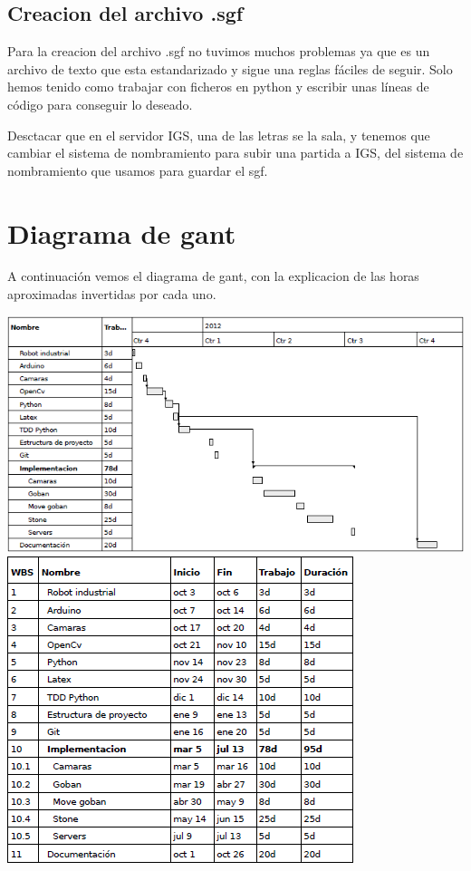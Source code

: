 \documentclass[12pt,a4paper]{report}
\begin{document}
\section{Creacion del archivo .sgf}

Para la creacion del archivo .sgf no tuvimos muchos problemas ya que es un
archivo de texto que esta estandarizado y sigue una reglas fáciles de seguir.
Solo hemos tenido como trabajar con ficheros en python y escribir unas líneas de
código para conseguir lo deseado.

Desctacar que en el servidor IGS, una de las letras se la sala, y tenemos que
cambiar el sistema de nombramiento para subir una partida a IGS, del sistema de
nombramiento que usamos para guardar el sgf. 


\chapter{Diagrama de gant}
A continuación vemos el diagrama de gant, con la explicacion de las horas aproximadas invertidas por cada uno.

\includegraphics[scale=0.9]{gant.png}\\
\includegraphics[scale=0.9]{gant2.png}
\end{document}
